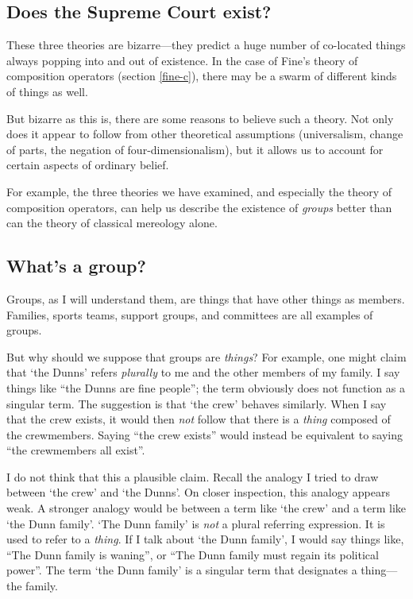 \documentclass[11pt]{article}
\begin{document}
\begin{spacing}{1.5}
\section{Does the Supreme Court exist?}
\label{groups}
These three theories are bizarre---they predict a huge number of
co-located things always popping into and out of existence.  In the
case of Fine's theory of composition operators (section \ref{fine-c}),
there may be a swarm of different kinds of things as well.  

But bizarre as this is, there are some reasons to believe such a
theory.  Not only does it appear to follow from other theoretical
assumptions (universalism, change of parts, the negation of
four-dimensionalism), but it allows us to account for certain aspects
of ordinary belief.

For example, the three theories we have examined, and especially the
theory of composition operators, can help us describe the existence of
{\em groups} better than can the theory of classical mereology alone.

\subsection{What's a group?}
\label{what-g}
Groups, as I will understand them, are things that have other things
as members.  Families, sports teams, support groups, and committees
are all examples of groups.

But why should we suppose that groups are {\em things}?  For example,
one might claim that `the Dunns' refers {\em plurally} to me and the
other members of my family.  I say things like ``the Dunns are fine
people''; the term obviously does not function as a singular term.
The suggestion is that `the crew' behaves similarly.  When I say that
the crew exists, it would then {\em not} follow that there is a {\em
  thing} composed of the crewmembers.  Saying ``the crew exists''
would instead be equivalent to saying ``the crewmembers all exist''.

I do not think that this a plausible claim.  Recall the analogy I
tried to draw between `the crew' and `the Dunns'.  On closer
inspection, this analogy appears weak.  A stronger analogy would be
between a term like `the crew' and a term like `the Dunn family'.
`The Dunn family' is {\em not} a plural referring expression.  It is
used to refer to a {\em thing}.  If I talk about `the Dunn family', I
would say things like, ``The Dunn family is waning'', or ``The Dunn
family must regain its political power''.  The term `the Dunn family'
is a singular term that designates a thing---the family.


\end{spacing}
\end{document}
